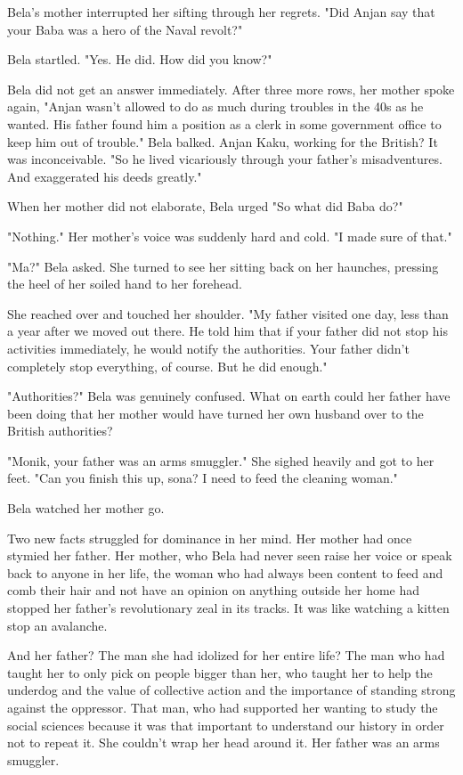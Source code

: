 \documentclass{amsart}
\begin{document}
Bela's mother interrupted her sifting through her regrets. "Did Anjan say that your Baba was a hero of the Naval revolt?" 

Bela startled. "Yes. He did. How did you know?"

Bela did not get an answer immediately. After three more rows, her mother spoke again, "Anjan wasn't allowed to do as much during troubles in the 40s as he wanted. His father found him a position as a clerk in some government office to keep him out of trouble." Bela balked. Anjan Kaku, working for the British? It was inconceivable. "So he lived vicariously through your father's misadventures. And exaggerated his deeds greatly." 

When her mother did not elaborate, Bela urged "So what did Baba do?"

"Nothing." Her mother's voice was suddenly hard and cold. "I made sure of that."

"Ma?" Bela asked. She turned to see her sitting back on her haunches, pressing the heel of her soiled hand to her forehead. 

She reached over and touched her shoulder. "My father visited one day, less than a year after we moved out there. He told him that if your father did not stop his activities immediately, he would notify the authorities. Your father didn't completely stop everything, of course. But he did enough."

"Authorities?" Bela was genuinely confused. What on earth could her father have been doing that her mother would have turned her own husband over to the British authorities?

"Monik, your father was an arms smuggler." She sighed heavily and got to her feet. "Can you finish this up, sona? I need to feed the cleaning woman." 

Bela watched her mother go. 

Two new facts struggled for dominance in her mind. Her mother had once stymied her father. Her mother, who Bela had never seen raise her voice or speak back to anyone in her life, the woman who had always been content to feed and comb their hair and not have an opinion on anything outside her home had stopped her father's revolutionary zeal in its tracks. It was like watching a kitten stop an avalanche. 

And her father? The man she had idolized for her entire life? The man who had taught her to only pick on people bigger than her, who taught her to help the underdog and the value of collective action and the importance of standing strong against the oppressor. That man, who had supported her wanting to study the social sciences because it was that important to understand our history in order not to repeat it. She couldn't wrap her head around it. Her father was an arms smuggler. 
\end{document}
